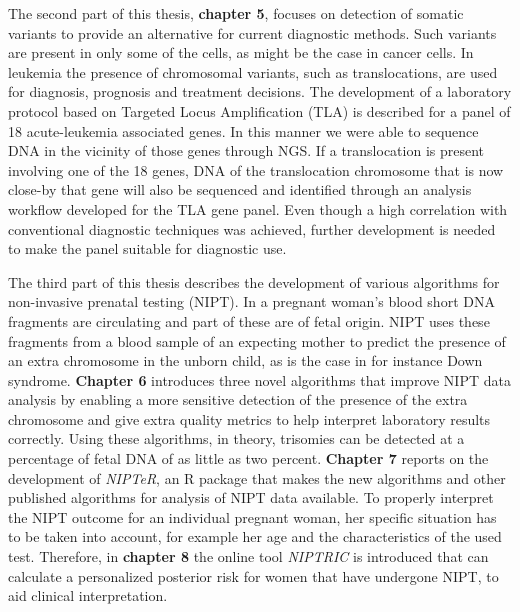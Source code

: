 \begin{appendices}
	The second part of this thesis, \textbf{chapter 5},  focuses on detection of somatic variants to provide an alternative for current diagnostic methods. Such variants are present in only some of the cells, as might be the case in cancer cells. In leukemia the presence of chromosomal variants, such as translocations, are used for diagnosis, prognosis and treatment decisions. The development of a laboratory protocol based on Targeted Locus Amplification (TLA) is described for a panel of 18 acute-leukemia associated genes. In this manner we were able to sequence DNA in the vicinity of those genes through NGS. If a translocation is present involving one of the 18 genes, DNA of the translocation chromosome that is now close-by that gene will also be sequenced and identified through an analysis workflow developed for the TLA gene panel. Even though a high correlation with conventional diagnostic techniques was achieved, further development is needed to make the panel suitable for diagnostic use.

	The third part of this thesis describes the development of various algorithms for non-invasive prenatal testing (NIPT). In a pregnant woman’s blood short DNA fragments are circulating and part of these are of fetal origin. NIPT  uses  these fragments from a blood sample of an expecting mother to predict the presence of an extra chromosome in the unborn child, as is the case in for instance Down syndrome. \textbf{Chapter 6} introduces three novel algorithms that improve NIPT data analysis by enabling a more sensitive detection of the presence of the extra chromosome and give extra quality metrics to help interpret laboratory results correctly. Using these algorithms, in theory, trisomies can be detected at a percentage of fetal DNA of as little as two percent. \textbf{Chapter 7} reports on the development of \textsl{NIPTeR}, an R package that makes the new algorithms and other published algorithms for analysis of NIPT data available. To properly interpret the NIPT outcome for an individual pregnant woman, her specific situation has to be taken into account, for example her age and the characteristics of the used test. Therefore, in \textbf{chapter 8} the online tool \textsl{NIPTRIC} is introduced that can calculate a personalized posterior risk for women that have undergone NIPT, to aid clinical interpretation.
	

\end{appendices}
